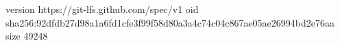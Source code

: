 version https://git-lfs.github.com/spec/v1
oid sha256:92dfdb27d98a1a6fd1cfe3f99f58d80a3a4c74c04c867ae05ae26994bd2e76aa
size 49248

